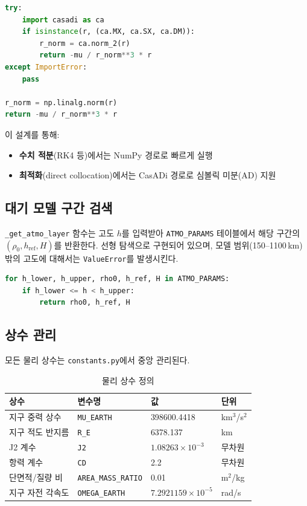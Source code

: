 \documentclass[11pt]{article}
\begin{document}
\begin{lstlisting}[language=Python]
try:
    import casadi as ca
    if isinstance(r, (ca.MX, ca.SX, ca.DM)):
        r_norm = ca.norm_2(r)
        return -mu / r_norm**3 * r
except ImportError:
    pass

r_norm = np.linalg.norm(r)
return -mu / r_norm**3 * r
\end{lstlisting}

이 설계를 통해:
\begin{itemize}
  \item \textbf{수치 적분}(RK4 등)에서는 NumPy 경로로 빠르게 실행
  \item \textbf{최적화}(direct collocation)에서는 CasADi 경로로 심볼릭 미분(AD) 지원
\end{itemize}

\subsection{대기 모델 구간 검색}

\texttt{\_get\_atmo\_layer} 함수는 고도 $h$를 입력받아 \texttt{ATMO\_PARAMS} 테이블에서 해당 구간의 $(\rho_0, h_{\text{ref}}, H)$를 반환한다. 선형 탐색으로 구현되어 있으며, 모델 범위(150--1100\,km) 밖의 고도에 대해서는 \texttt{ValueError}를 발생시킨다.

\begin{lstlisting}[language=Python]
for h_lower, h_upper, rho0, h_ref, H in ATMO_PARAMS:
    if h_lower <= h < h_upper:
        return rho0, h_ref, H
\end{lstlisting}

\subsection{상수 관리}

모든 물리 상수는 \texttt{constants.py}에서 중앙 관리된다.

\begin{table}[h]
\centering
\caption{물리 상수 정의}
\label{tab:constants}
\begin{tabular}{llll}
\toprule
상수 & 변수명 & 값 & 단위 \\
\midrule
지구 중력 상수 & \texttt{MU\_EARTH} & 398600.4418 & km$^3$/s$^2$ \\
지구 적도 반지름 & \texttt{R\_E} & 6378.137 & km \\
J2 계수 & \texttt{J2} & $1.08263 \times 10^{-3}$ & 무차원 \\
항력 계수 & \texttt{CD} & 2.2 & 무차원 \\
단면적/질량 비 & \texttt{AREA\_MASS\_RATIO} & 0.01 & m$^2$/kg \\
지구 자전 각속도 & \texttt{OMEGA\_EARTH} & $7.2921159 \times 10^{-5}$ & rad/s \\
\bottomrule
\end{tabular}
\end{table}
\end{document}
